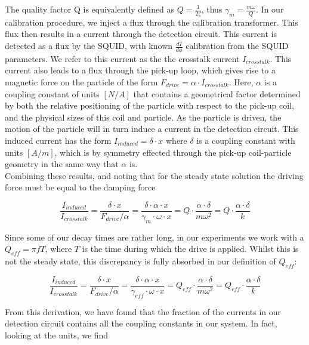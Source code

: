 \begin{appendices}
The quality factor Q is equivalently defined as $Q = \frac{1}{2\zeta}$, thus $\gamma_m = \frac{m\omega}{Q}$.
In our calibration procedure, we inject a flux through the calibration transformer. This flux then results in a current through the detection circuit. This current is detected as a flux by the SQUID, with known $\frac{dI}{d\phi}$ calibration from the SQUID parameters. We refer to this current as the the crosstalk current $I_{crosstalk}$. This current also leads to a flux through the pick-up loop, which gives rise to a magnetic force on the particle of the form $F_{drive}=\alpha \cdot I_{crosstalk}$. Here, $\alpha$ is a coupling constant of units $\si{[N/A]}$ that contains a geometrical factor determined by both the relative positioning of the particle with respect to the pick-up coil, and the physical sizes of this coil and particle. As the particle is driven, the motion of the particle will in turn induce a current in the detection circuit. This induced current has the form $I_{induced}=\delta\cdot x$ where $\delta$ is a coupling constant with units $\si{[A/m]}$, which is by symmetry effected through the pick-up coil-particle geometry in the same way that $\alpha$ is.\\
Combining these results, and noting that for the steady state solution the driving force must be equal to the damping force

\begin{equation}
    \frac{I_{induced}}{I_{crosstalk}} =
    \frac{\delta\cdot x}{F_{drive}/\alpha} =
    \frac{\delta \cdot \alpha\cdot x}{\gamma_m \cdot \omega \cdot x} =
    Q\cdot \frac{\alpha\cdot\delta}{m\omega^2} = 
    Q\cdot \frac{\alpha\cdot\delta}{k}
    \label{eq:I/I}
\end{equation}

Since some of our decay times are rather long, in our experiments we work with a $Q_{eff} = \pi fT$, where $T$ is the time during which the drive is applied. Whilst this is not the steady state, this discrepancy is fully absorbed in our definition of $Q_{eff}$:

\begin{equation}
    \frac{I_{induced}}{I_{crosstalk}} =
    \frac{\delta\cdot x}{F_{drive}/\alpha} =
    \frac{\delta \cdot \alpha\cdot x}{\gamma_{eff} \cdot \omega \cdot x} =
    Q_{eff}\cdot \frac{\alpha\cdot\delta}{m\omega^2} = 
    Q_{eff}\cdot \frac{\alpha\cdot\delta}{k}
\end{equation}

From this derivation, we have found that the fraction of the currents in our detection circuit contains all the coupling constants in our system. In fact, looking at the units, we find


\end{appendices}

